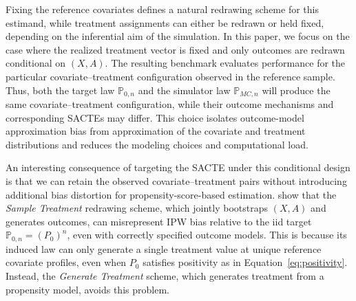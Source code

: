 Fixing the reference covariates defines a natural redrawing scheme for this estimand, while treatment assignments can either be redrawn or held fixed, depending on the inferential aim of the simulation. In this paper, we focus on the case where the realized treatment vector is fixed and only outcomes are redrawn conditional on \((X,A)\). The resulting benchmark evaluates performance for the particular covariate--treatment configuration observed in the reference sample. Thus, both the target law \(\mathbb P_{0,n}\) and the simulator law \(\mathbb P_{MC,n}\) will produce the same covariate--treatment configuration, while their outcome mechanisms and corresponding SACTEs may differ. This choice isolates outcome-model approximation bias from approximation of the covariate and treatment distributions and reduces the modeling choices and computational load.

An interesting consequence of targeting the SACTE under this conditional design is that we can retain the observed covariate--treatment pairs without introducing additional bias distortion for propensity-score-based estimation.  show that the \emph{Sample Treatment} redrawing scheme, which jointly bootstraps $(X,A)$ and generates outcomes, can misrepresent IPW bias relative to the iid target $\mathbb P_{0,n}=(P_0)^n$, even with correctly specified outcome models. This is because its induced law can only generate a single treatment value at unique reference covariate profiles, even when $P_0$ satisfies positivity as in Equation~\eqref{eq:positivity}. Instead, the \emph{Generate Treatment} scheme, which generates treatment from a propensity model, avoids this problem.

